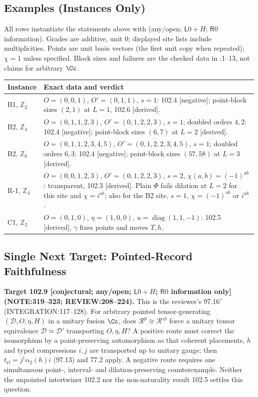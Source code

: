 \subsection{Examples (Instances Only)}
All rows instantiate the statements above with (any/open; \(\mathsf L0+H\); \(\mathsf R0\) information).
Grades are additive, unit \(0\); displayed site lists include multiplicities. Points are unit basis vectors
(the first unit copy when repeated); \(\chi=1\) unless specified. Block sizes and failures are the checked
data in :1--13, not claims for arbitrary \(\Cc\).
\begin{center}\footnotesize
\begin{tabular}{p{2.1cm}p{12.0cm}}\toprule
Instance & Exact data and verdict \\\midrule
B1, \(\mathbb Z_2\) & \(O=(0,0,1)\), \(O'=(0,1,1)\), \(s=1\): 102.4 [negative]; point-block sizes \((2,1)\) at \(L=1\), 102.6 [derived]. \\
B2, \(\mathbb Z_4\) & \(O=(0,1,1,2,3)\), \(O'=(0,1,2,2,3)\), \(s=1\); doubled orders \(4,2\): 102.4 [negative]; point-block sizes \((6,7)\) at \(L=2\) [derived]. \\
B2, \(\mathbb Z_6\) & \(O=(0,1,1,2,3,4,5)\), \(O'=(0,1,2,2,3,4,5)\), \(s=1\); doubled orders \(6,3\): 102.4 [negative]; point-block sizes \((57,58)\) at \(L=3\) [derived]. \\
R-1, \(\mathbb Z_4\) & \(O=(0,0,1,2,3)\), \(O'=(0,1,2,2,3)\), \(s=2\), \(\chi(a,b)=(-1)^{ab}\): transparent, 102.3 [derived]. Plain \(\Phi\) fails dilation at \(L=2\) for this site and \(\chi=i^{ab}\); also for the B2 site, \(s=1\), \(\chi=(-1)^{ab}\) or \(i^{ab}\). \\
C1, \(\mathbb Z_2\) & \(O=(0,1,0)\), \(\eta=(1,0,0)\), \(u=\operatorname{diag}(1,1,-1)\): 102.5 [derived], \(\gamma\) fixes points and moves \(T,h\). \\\bottomrule
\end{tabular}
\end{center}

\subsection{Single Next Target: Pointed-Record Faithfulness}

\textbf{Target 102.9 [conjectural; any/open; \(\mathsf L0+H\); \(\mathsf R0\) information only]\newline (NOTE:319--323; REVIEW:208--224).}
This is the reviewer's 97.16\('\) (INTEGRATION:117--128). For arbitrary pointed tensor-generating
\((\mathcal D,O,\eta,H)\) in a unitary fusion \(\Cc\), does \(\mathcal R^p\cong\mathcal R'^p\) force
a unitary tensor equivalence \(\mathcal D\simeq\mathcal D'\) transporting \(O,\eta,H\)? A positive route must correct the isomorphism by
a point-preserving automorphism so that coherent placements, \(h\) and typed compressions \(i,j\) are
transported up to unitary gauge; then \(t_O=j^\dagger\alpha_2(h)i\) (97.13) and 77.2 apply.
A negative route requires one simultaneous point-, interval- and dilation-preserving counterexample.
Neither the unpointed intertwiner 102.2 nor the non-naturality result 102.5 settles this question.
